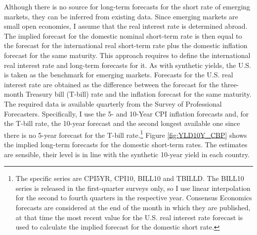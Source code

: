 {%

Although there is no source for long-term forecasts for the short rate of emerging markets, they can be inferred from existing data. 
Since emerging markets are small open economies, I assume that the real interest rate is determined abroad. 
The implied forecast for the domestic nominal short-term rate is then equal to the forecast for the international real short-term rate plus the domestic inflation forecast for the same maturity. 
This approach requires to define the international real interest rate and long-term forecasts for it.
As with synthetic yields, the U.S. is taken as the benchmark for emerging markets. 
Forecasts for the U.S. real interest rate are obtained as the difference between the forecast for the three-month Treasury bill (T-bill) rate and the inflation forecast for the same maturity.
The required data is available quarterly from the Survey of Professional Forecasters.
Specifically, I use the 5- and 10-Year CPI inflation forecasts and, for the T-bill rate, the 10-year forecast and the second longest available one
since there is no 5-year forecast for the T-bill rate.\footnote{ The specific series are CPI5YR, CPI10, BILL10 and TBILLD. The BILL10 series is released in the first-quarter surveys only, so I use linear interpolation for the second to fourth quarters in the respective year. Consensus Economics forecasts are considered at the end of the month in which they are published, at that time the most recent value for the U.S. real interest rate forecast is used to calculate the implied forecast for the domestic short rate.}
Figure \ref{fig:YLD10Y_CBP} shows the implied long-term forecasts for the domestic short-term rates. 
The estimates are sensible, their level is in line with the synthetic 10-year yield in each country.

}
